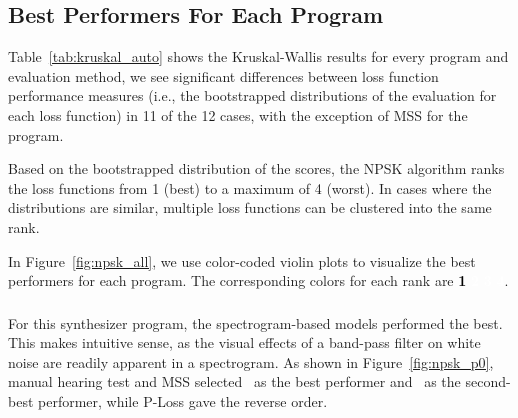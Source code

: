 
\subsection{Best Performers For Each Program}
Table~\ref{tab:kruskal_auto} shows the Kruskal-Wallis results for every program and evaluation method, we see significant differences between loss function performance measures (i.e., the bootstrapped distributions of the evaluation for each loss function) in 11 of the 12 cases, with the exception of  MSS for the \AmpMod{} program.  

Based on the bootstrapped distribution of the scores, the NPSK algorithm ranks the loss functions from 1 (best) to a maximum of 4 (worst). In cases where the distributions are similar, multiple loss functions can be clustered into the same rank.

In Figure~\ref{fig:npsk_all}, we use color-coded violin plots to visualize the best performers for each program. The corresponding colors for each rank are
\colorbox{rank1}{\textcolor{black}{\textbf{1}}} \colorbox{rank2}{\textcolor{white}{\textbf{2}}} \colorbox{rank3}{\textcolor{white}{\textbf{3}}} \colorbox{rank4}{\textcolor{black}{\textcolor{white}{\textbf{4}}}}.




\subsubsection{\BPNoise}
For this synthesizer program, the spectrogram-based models performed the best. This makes intuitive sense, as the visual effects of a band-pass filter on white noise are readily apparent in a spectrogram. As shown in Figure~\ref{fig:npsk_p0}, manual hearing test and MSS selected \SIMSESpec~as the best performer and \LoneSpec~as the second-best performer, while P-Loss gave the reverse order. 


